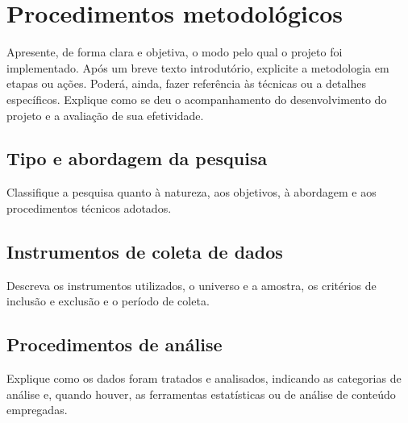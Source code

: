 
\section{Procedimentos metodológicos}

Apresente, de forma clara e objetiva, o modo pelo qual o projeto foi
implementado. Após um breve texto introdutório, explicite a metodologia em etapas
ou ações. Poderá, ainda, fazer referência às técnicas ou a detalhes específicos.
Explique como se deu o acompanhamento do desenvolvimento do projeto e a avaliação
de sua efetividade.

\subsection{Tipo e abordagem da pesquisa}

Classifique a pesquisa quanto à natureza, aos objetivos, à abordagem e aos
procedimentos técnicos adotados.

\subsection{Instrumentos de coleta de dados}

Descreva os instrumentos utilizados, o universo e a amostra, os critérios de
inclusão e exclusão e o período de coleta.

\subsection{Procedimentos de análise}

Explique como os dados foram tratados e analisados, indicando as categorias de
análise e, quando houver, as ferramentas estatísticas ou de análise de conteúdo
empregadas.

